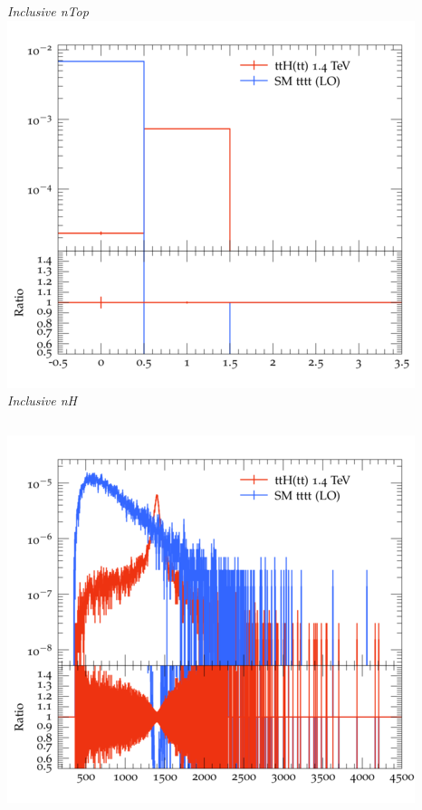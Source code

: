 \documentclass{beamer}
\begin{document}
\begin{frame}
\begin{columns}
\textit{\small Inclusive nTop}
\includegraphics[width=\textwidth]{../plots/ttH_1400/tttt_ttH/Inclusive_nH.png}\\
\textit{\small Inclusive nH}
\end{columns}
\begin{columns}
\includegraphics[width=\textwidth]{../plots/ttH_1400/tttt_ttH/Inclusive_InvM_ttbar12.png}\\

\end{columns}
\end{frame}
\end{document}
